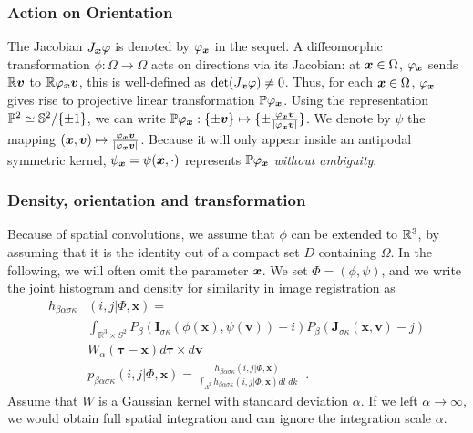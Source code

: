 \documentclass[twocolumn]{svjour3}
\begin{document}
\subsubsection{Action on Orientation}
The Jacobian $J_{\boldsymbol{x}}\varphi$ is denoted by $\varphi_{\boldsymbol{x}}$ in the sequel.
A diffeomorphic transformation $\phi:\Omega\to \Omega$ acts on directions via its Jacobian: at
$\boldsymbol{x}\in \Omega$, $\varphi_{\boldsymbol{x}}$ sends ${\mathbb R}\boldsymbol{v}$ to ${\mathbb R} \varphi_{\boldsymbol{x}} \boldsymbol{v}$, this is 
well-defined as $\det(J_{\boldsymbol{x}}\varphi)\not = 0$. Thus, for each $\boldsymbol{x}\in \Omega$,  $\varphi_{\boldsymbol{x}}$ gives rise to projective 
linear transformation ${\mathbb P}\varphi_{\boldsymbol{x}}$. Using the representation
${\mathbb P}^2\simeq {\mathbb S}^2/\{\pm1\}$, we can write
${\mathbb P}\varphi_{\boldsymbol{x}}:\{\pm \boldsymbol{v}\} \mapsto \{\pm\frac{\varphi_{\boldsymbol{x}}\boldsymbol{v}}{|\varphi_{\boldsymbol{x}}\boldsymbol{v}|}\}$.
We denote by $\psi$ the mapping
$(\boldsymbol{x},\boldsymbol{v})\mapsto \frac{\varphi_{\boldsymbol{x}}\boldsymbol{v}}{|\varphi_{\boldsymbol{x}}\boldsymbol{v}|}$. Because it will only
appear inside an antipodal symmetric kernel, $\psi_{\boldsymbol{x}} = \psi(\boldsymbol{x},\cdot)$ represents
${\mathbb P}{\varphi_{\boldsymbol{x}}}$ \emph{without ambiguity}.

\subsubsection{Density, orientation and transformation}
Because of spatial convolutions, we assume that $\phi$ can be extended to ${\mathbb R}^3$, by assuming that it is the identity out
of a compact set $D$ containing $\Omega$.
In the following, we will often omit the parameter $\boldsymbol{x}$. We set $\Phi = (\phi,\psi)$,
and we write the joint histogram and density for similarity in image registration as
\begin{align}
  h_{\beta\alpha\sigma\kappa}&(i,j|\Phi,\bm x)=\\ 
                      &\int_{\mathbb R^3 \times S^2}P_\beta(\bm I_{\sigma\kappa}(\phi(\bm x),\psi(\bm v))-i)
                        P_\beta(\bm J_{\sigma\kappa}(\bm x,\bm v)-j)\nonumber \\
                      &W_\alpha(\bm \tau-\bm x)d\bm \tau\times d\bm v \nonumber \label{eq:densityreg} \\
                      &p_{\beta\alpha\sigma\kappa}(i,j|\Phi,\bm x)=\frac{h_{\beta\alpha\sigma\kappa}(i,j|\Phi,\bm x)}
                       {\int_{\Lambda^{2}} h_{\beta\alpha\sigma\kappa}(i,j| \Phi,\bm x)dl\;dk} \;\;.
\end{align}
Assume that $W$ is a Gaussian kernel with standard deviation $\alpha$. If we left
$\alpha\rightarrow\infty$, we would obtain full spatial integration and can ignore the
integration scale $\alpha$.
\end{document}
